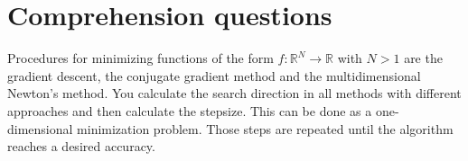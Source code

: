 \setcounter{section}{-1}
\section{Comprehension questions}
Procedures for minimizing functions of the form $f : \mathbb{R}^N \rightarrow \mathbb{R}$ with $N>1$ are the gradient descent, the conjugate gradient method and the multidimensional Newton's method.
You calculate the search direction in all methods with different approaches and then calculate the stepsize. This can be done as a one-dimensional minimization problem.
Those steps are repeated until the algorithm reaches a desired accuracy.
